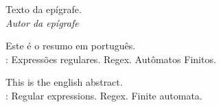\documentclass[a4paper,12pt,oneside,onecolumn]{uerj}
\begin{document}
  \vfill\vfill\vfill\vfill
  \begin{flushright}
    Texto da epígrafe.\\
    \textsl{Autor da epígrafe}
  \end{flushright}
  \vfill




Este é o resumo em português.\\

: Expressões regulares. Regex. Autômatos Finitos.



This is the english abstract.\\

: Regular expressions. Regex. Finite automata.


\listadefiguras
\listadetabelas


\listadealgoritmos






\end{document}
